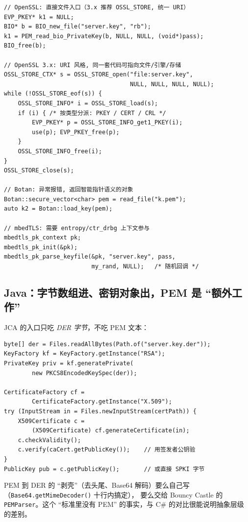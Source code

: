 \documentclass[12pt,a4paper,fontset=fandol]{ctexbook}
\newcommand{\Tp}[1]{\texttt{#1}}
\newcommand{\CSharp}{C\#}
\begin{document}
\begin{lstlisting}[caption={C/C++：四家库装载同一段 PEM 私钥}]
// OpenSSL: 直接文件入口（3.x 推荐 OSSL_STORE, 统一 URI）
EVP_PKEY* k1 = NULL;
BIO* b = BIO_new_file("server.key", "rb");
k1 = PEM_read_bio_PrivateKey(b, NULL, NULL, (void*)pass);
BIO_free(b);

// OpenSSL 3.x: URI 风格, 同一套代码可指向文件/引擎/存储
OSSL_STORE_CTX* s = OSSL_STORE_open("file:server.key",
                                    NULL, NULL, NULL, NULL);
while (!OSSL_STORE_eof(s)) {
    OSSL_STORE_INFO* i = OSSL_STORE_load(s);
    if (i) { /* 按类型分派: PKEY / CERT / CRL */
        EVP_PKEY* p = OSSL_STORE_INFO_get1_PKEY(i);
        use(p); EVP_PKEY_free(p);
    }
    OSSL_STORE_INFO_free(i);
}
OSSL_STORE_close(s);

// Botan: 异常报错, 返回智能指针语义的对象
Botan::secure_vector<char> pem = read_file("k.pem");
auto k2 = Botan::load_key(pem);

// mbedTLS: 需要 entropy/ctr_drbg 上下文参与
mbedtls_pk_context pk;
mbedtls_pk_init(&pk);
mbedtls_pk_parse_keyfile(&pk, "server.key", pass,
                         my_rand, NULL);   /* 随机回调 */
\end{lstlisting}

\subsection{Java：字节数组进、密钥对象出，PEM 是 ``额外工作''}

JCA 的入口只吃 \emph{DER 字节}，不吃 PEM 文本：

\begin{lstlisting}[style=javastyle,caption={Java：PKCS\#8 私钥与 X.509 证书装载}]
byte[] der = Files.readAllBytes(Path.of("server.key.der"));
KeyFactory kf = KeyFactory.getInstance("RSA");
PrivateKey priv = kf.generatePrivate(
        new PKCS8EncodedKeySpec(der));

CertificateFactory cf =
        CertificateFactory.getInstance("X.509");
try (InputStream in = Files.newInputStream(certPath)) {
    X509Certificate c =
        (X509Certificate) cf.generateCertificate(in);
    c.checkValidity();
    c.verify(caCert.getPublicKey());    // 用签发者公钥验
}
PublicKey pub = c.getPublicKey();       // 或直接 SPKI 字节
\end{lstlisting}

PEM 到 DER 的 ``剥壳''（去头尾、Base64 解码）要么自己写
（\Tp{Base64.\allowbreak get\allowbreak{}Mime\allowbreak{}Decoder()} 十行内搞定），
要么交给 Bouncy Castle 的 \Tp{PEMParser}。这个 ``标准里没有 PEM''
的事实，与 \CSharp{} 的对比很能说明抽象层级的差别。
\end{document}
